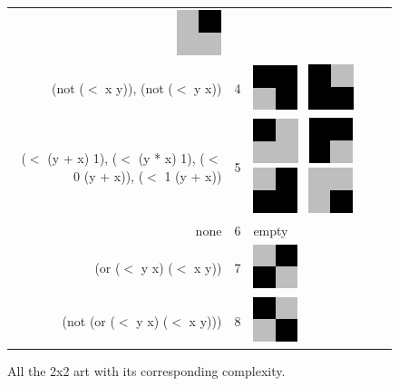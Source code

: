 \begin{figure}
\begin{center}
\begin{tabular}{r c l}
    \includegraphics[width=.25in]{../presentation/2x2/Shape4LVL3.png}\\
\tiny{(not ($<$ x y)), (not ($<$ y x))} & 4 & 
    \includegraphics[width=.25in]{../presentation/2x2/Shape2LVL4.png}~
    \includegraphics[width=.25in]{../presentation/2x2/Shape1LVL4.png} \\
\tiny{($<$ (y + x) 1), ($<$ (y * x) 1), ($<$ 0 (y + x)), ($<$ 1 (y + x))} & 5 & 
    \includegraphics[width=.25in]{../presentation/2x2/Shape2LVL5.png}~
    \includegraphics[width=.25in]{../presentation/2x2/Shape1LVL5.png}~
    \includegraphics[width=.25in]{../presentation/2x2/Shape3LVL5.png}~
    \includegraphics[width=.25in]{../presentation/2x2/Shape4LVL5.png} \\
\tiny{none} & 6 & empty \\
\tiny{(or ($<$ y  x) ($<$ x  y))} & 7 &
    \includegraphics[width=.25in]{../presentation/2x2/Shape1LVL7.png}\\
\tiny{(not (or ($<$ y  x) ($<$ x  y)))} & 8 &
    \includegraphics[width=.25in]{../presentation/2x2/Shape1LVL8.png}
\end{tabular}
\end{center}

\caption{All the 2x2 art with its corresponding complexity.}
\label{fig:2x2}
\end{figure}

